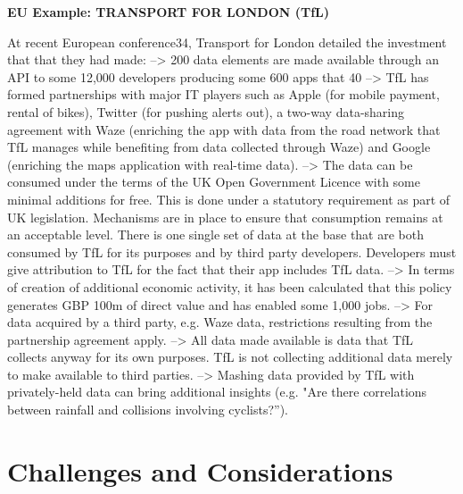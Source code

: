 \textbf{EU Example: TRANSPORT FOR LONDON (TfL)}

At recent European conference34, Transport for London detailed the investment that that they had
made:
--> 200 data elements are made available through an API to some 12,000 developers producing
some 600 apps that 40%
--> TfL has formed partnerships with major IT players such as Apple (for mobile payment, rental of
bikes), Twitter (for pushing alerts out), a two-way data-sharing agreement with Waze (enriching
the app with data from the road network that TfL manages while benefiting from data collected
through Waze) and Google (enriching the maps application with real-time data).
--> The data can be consumed under the terms of the UK Open Government Licence with some
minimal additions for free. This is done under a statutory requirement as part of UK legislation.
Mechanisms are in place to ensure that consumption remains at an acceptable level. There is
one single set of data at the base that are both consumed by TfL for its purposes and by third
party developers. Developers must give attribution to TfL for the fact that their app includes TfL
data.
--> In terms of creation of additional economic activity, it has been calculated that this policy
generates GBP 100m of direct value and has enabled some 1,000 jobs.
--> For data acquired by a third party, e.g. Waze data, restrictions resulting from the partnership
agreement apply.
--> All data made available is data that TfL collects anyway for its own purposes. TfL is not
collecting additional data merely to make available to third parties.
--> Mashing data provided by TfL with privately-held data can bring additional insights (e.g. "Are
there correlations between rainfall and collisions involving cyclists?”).

\section{Challenges and Considerations}

